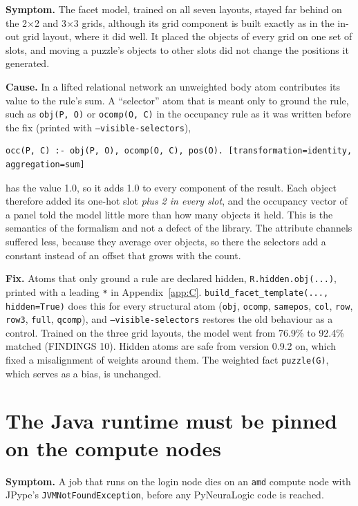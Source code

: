 \textbf{Symptom.} The facet model, trained on all seven layouts, stayed far behind on the 2×2 and 3×3 grids, although its grid component is built exactly as in the in-out grid layout, where it did well. It placed the objects of every grid on one set of slots, and moving a puzzle's objects to other slots did not change the positions it generated.

\textbf{Cause.} In a lifted relational network an unweighted body atom contributes its value to the rule's sum. A ``selector'' atom that is meant only to ground the rule, such as \texttt{obj(P, O)} or \texttt{ocomp(O, C)} in the occupancy rule as it was written before the fix (printed with \texttt{--visible-selectors}),

\begin{Verbatim}[fontsize=\small,breaklines]
occ(P, C) :- obj(P, O), ocomp(O, C), pos(O). [transformation=identity, aggregation=sum]
\end{Verbatim}

has the value 1.0, so it adds 1.0 to every component of the result. Each object therefore added its one-hot slot \emph{plus 2 in every slot}, and the occupancy vector of a panel told the model little more than how many objects it held. This is the semantics of the formalism and not a defect of the library. The attribute channels suffered less, because they average over objects, so there the selectors add a constant instead of an offset that grows with the count.

\textbf{Fix.} Atoms that only ground a rule are declared hidden, \texttt{R.hidden.obj(...)}, printed with a leading \texttt{*} in Appendix~\ref{app:C}. \texttt{build\_facet\_template(..., hidden=True)} does this for every structural atom (\texttt{obj}, \texttt{ocomp}, \texttt{samepos}, \texttt{col}, \texttt{row}, \texttt{row3}, \texttt{full}, \texttt{qcomp}), and \texttt{--visible-selectors} restores the old behaviour as a control. Trained on the three grid layouts, the model went from 76.9\% to 92.4\% matched (FINDINGS 10). Hidden atoms are safe from version 0.9.2 on, which fixed a misalignment of weights around them. The weighted fact \texttt{puzzle(G)}, which serves as a bias, is unchanged.

\section{The Java runtime must be pinned on the compute nodes}\label{sec:A.4}

\textbf{Symptom.} A job that runs on the login node dies on an \texttt{amd} compute node with JPype's \texttt{JVMNotFoundException}, before any PyNeuraLogic code is reached.

